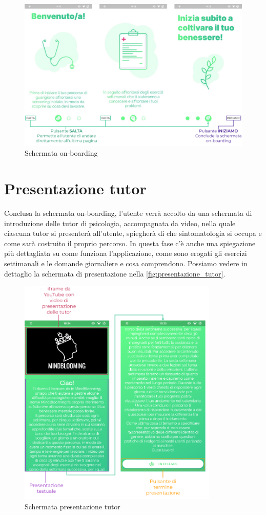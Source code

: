 \begin{figure}[h!]
\centering
\includegraphics[width=\textwidth]{img/on_boarding}
\caption{Schermata on-boarding}
\label{fig:on_boarding}
\end{figure}

\newpage
\section{Presentazione tutor}
Conclusa la schermata on-boarding, l'utente verrà accolto da una schermata di introduzione delle tutor di psicologia, accompagnata da video, nella quale ciascuna tutor si presenterà all'utente, spiegherà di che sintomatologia si occupa e come sarà costruito il proprio percorso. In questa fase c'è anche una spiegazione più dettagliata su come funziona l'applicazione, come sono erogati gli esercizi settimanali e le domande giornaliere e cosa comprendono. Possiamo vedere in dettaglio la schermata di presentazione nella \autoref{fig:presentazione_tutor}.

\begin{figure}[h!]
\centering
\includegraphics[width=0.85\textwidth]{img/presentazione_tutor}
\caption{Schermata presentazione tutor}
\label{fig:presentazione_tutor}
\end{figure}

